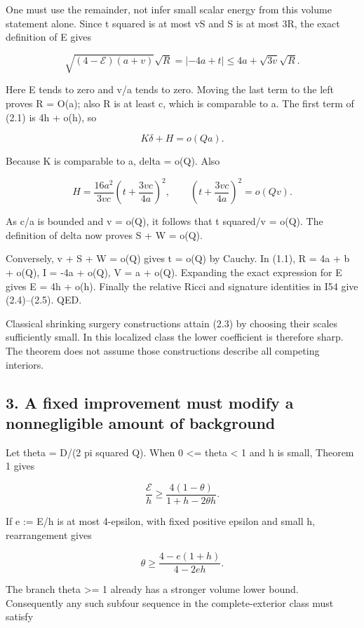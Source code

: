 \documentclass[
  10pt,
]{article}
\begin{document}
One must use the remainder, not infer small scalar energy from this
volume statement alone. Since t squared is at most vS and S is at most
3R, the exact definition of E gives

\[
 \sqrt{(4-\mathcal E)(a+v)}\sqrt R
       =|-4a+t|\le4a+\sqrt{3v}\sqrt R.
\]

Here E tends to zero and v/a tends to zero. Moving the last term to the
left proves R = O(a); also R is at least c, which is comparable to a.
The first term of (2.1) is 4h + o(h), so

\[
 K\delta+H=o(Qa).
\]

Because K is comparable to a, delta = o(Q). Also

\[
 H=\frac{16a^2}{3vc}\left(t+\frac{3vc}{4a}\right)^2,
 \qquad
 \left(t+\frac{3vc}{4a}\right)^2=o(Qv).
\]

As c/a is bounded and v = o(Q), it follows that t squared/v = o(Q). The
definition of delta now proves S + W = o(Q).

Conversely, v + S + W = o(Q) gives t = o(Q) by Cauchy. In (1.1), R = 4a
+ b + o(Q), I = -4a + o(Q), V = a + o(Q). Expanding the exact expression
for E gives E = 4h + o(h). Finally the relative Ricci and signature
identities in I54 give (2.4)--(2.5). QED.

Classical shrinking surgery constructions attain (2.3) by choosing their
scales sufficiently small. In this localized class the lower coefficient
is therefore sharp. The theorem does not assume those constructions
describe all competing interiors.

\hypertarget{a-fixed-improvement-must-modify-a-nonnegligible-amount-of-background}{%
\subsection{3. A fixed improvement must modify a nonnegligible amount of
background}\label{a-fixed-improvement-must-modify-a-nonnegligible-amount-of-background}}

Let theta = D/(2 pi squared Q). When 0 \textless= theta \textless{} 1
and h is small, Theorem 1 gives

\[
 \frac{\mathcal E}{h}\ge
        \frac{4(1-\theta)}{1+h-2\theta h}.                \tag{3.1}
\]

If e := E/h is at most 4-epsilon, with fixed positive epsilon and small
h, rearrangement gives

\[
 \theta\ge\frac{4-e(1+h)}{4-2eh}.
\]

The branch theta \textgreater= 1 already has a stronger volume lower
bound. Consequently any such subfour sequence in the complete-exterior
class must satisfy
\end{document}
